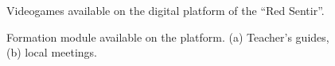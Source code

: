 \documentclass[journal,transmag]{IEEEtran}
\begin{document}
\begin{figure}[tbp]
  \centering
	  \hspace{1mm}
  \caption{Videogames available on the digital platform of the ``Red Sentir''.}
  \label{fig:juegos}
\end{figure}

\begin{figure}[tbp]
  \centering
	  \hspace{1mm}
  \caption{Formation module available on the platform. (a) Teacher's guides, (b) local meetings.}
  \label{fig:formacion}
\end{figure}
\end{document}
